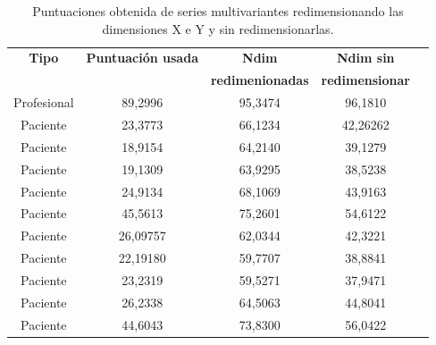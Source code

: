 \begin{table}
	\centering
		\begin{tabular}{|c|c|c|c|c|}
			\hline
			   \textbf{Tipo}     & \textbf{Puntuación usada} & \textbf{Ndim} & \textbf{Ndim sin } \\ 
			    ~    &  ~ & \textbf{ redimenionadas} & \textbf{redimensionar} \\ \hline
			   
			 Profesional &       89,2996  & 95,3474 &  96,1810   \\ \hline
			 Paciente &       23,3773   & 66,1234 &  42,26262   \\ \hline
			 Paciente &       18,9154  & 64,2140 &  39,1279   \\ \hline
			 Paciente   &       19,1309  & 63,9295 &  38,5238   \\ \hline
			 Paciente   &       24,9134  & 68,1069 &  43,9163   \\ \hline
			 Paciente   &       45,5613   & 75,2601 &  54,6122   \\ \hline
			 Paciente   &       26,09757   & 62,0344 &  42,3221   \\ \hline
			 Paciente   &       22,19180  & 59,7707 &  38,8841   \\ \hline
			 Paciente   &       23,2319  & 59,5271 &  37,9471   \\ \hline
			 Paciente   &		26,2338  & 64,5063 &  44,8041	\\ \hline
			 Paciente   &		44,6043  & 73,8300 &  56,0422	\\ \hline

		\end{tabular}
	\caption{Puntuaciones obtenida de series multivariantes redimensionando las dimensiones X e Y y sin redimensionarlas.}
	\label{tab:tryscore2}
\end{table}



